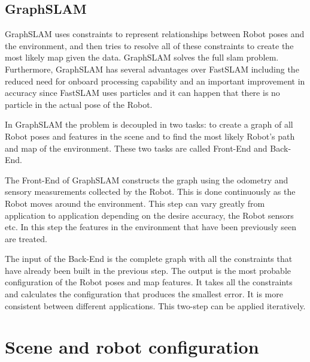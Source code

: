 \documentclass[10pt,journal,compsoc]{IEEEtran}
\begin{document}
\subsection{GraphSLAM}
GraphSLAM uses constraints to represent relationships between Robot poses and the environment, and then tries to resolve all of these constraints to create the most likely map given the data. GraphSLAM solves the full slam problem. Furthermore, GraphSLAM has several advantages over FastSLAM including the reduced need for onboard processing capability and an important improvement in accuracy since FastSLAM uses particles and it can happen that there is no particle in the actual pose of the Robot. 

In GraphSLAM the problem is decoupled in two tasks: to create a graph of all Robot poses and features in the scene and to find the most likely Robot's path and map of the environment. These two tasks are called Front-End and Back-End.

The Front-End of GraphSLAM constructs the graph using the odometry and sensory measurements collected by the Robot. This is done continuously as the Robot moves around the environment. This step can vary greatly from application to application depending on the desire accuracy, the Robot sensors etc. In this step the features in the environment that have been previously seen are treated. 

The input of the Back-End is the complete graph with all the constraints that have already been built in the previous step. The output is the most probable configuration of the Robot poses and map features. It takes all the constraints and calculates the configuration that produces the smallest error. It is more consistent between different applications. This two-step can be applied iteratively.
\section{Scene and robot configuration}
\end{document}
